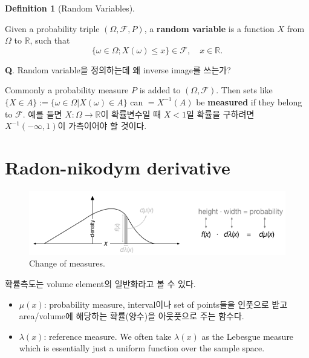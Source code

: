 \documentclass[
  letterpaper,
  DIV=11,
  numbers=noendperiod]{scrreprt}
\theoremstyle{plain}
\theoremstyle{definition}
\theoremstyle{definition}
\newtheorem{definition}{Definition}[chapter]
\theoremstyle{plain}
\theoremstyle{plain}
\theoremstyle{remark}
\begin{document}
\begin{definition}[Random
Variables]\protect\hypertarget{def-rvs}{}\label{def-rvs}

Given a probability triple \((\Omega, \mathcal{F}, P)\), a
\textbf{random variable} is a function \(X\) from \(\Omega\) to
\(\mathbb{R}\), such that \[
\{ \omega \in \Omega; X(\omega) \leq x  \} \in \mathcal{F} ,\quad{} x \in \mathbb{R}.
\]

\end{definition}

\textbf{Q}. Random variable을 정의하는데 왜 inverse image를 쓰는가?

Commonly a probability measure \(P\) is added to
\((\Omega, \mathcal{F})\). Then sets like
\(\{X \in A\}:= \{\omega \in \Omega | X(\omega) \in A\}\) can
\(=X^{-1}(A)\) be \textbf{measured} if they belong to \(\mathcal{F}\).
예를 들면 \(X: \Omega \rightarrow \mathbb{R}\)이 확률변수일 때 \(X<1\)일
확률을 구하려면 \(X^{-1}(-\infty, 1)\)이 가측이어야 할 것이다.

\section{Radon-nikodym derivative}\label{radon-nikodym-derivative}

\begin{figure}[H]

{\centering \includegraphics[width=1\textwidth,height=\textheight]{images/radon-nikodym.png}

}

\caption{Change of measures.}

\end{figure}%

확률측도는 volume element의 일반화라고 볼 수 있다.

\begin{itemize}
\item
  \(\mu(x)\): probability measure, interval이나 set of points들을
  인풋으로 받고 area/volume에 해당하는 확률(양수)을 아웃풋으로 주는
  함수다.
\item
  \(\lambda (x)\): reference measure. We often take \(\lambda (x)\) as
  the Lebesgue measure which is essentially just a uniform function over
  the sample space.
\end{itemize}
\end{document}
